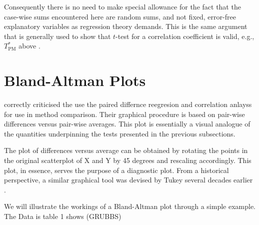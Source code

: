 \documentclass[12pt, a4paper]{report}
\theoremstyle{plain}
\theoremstyle{definition}
\theoremstyle{remark}
\begin{document}
Consequently there is no need to make special allowance for the fact that the case-wise sums encountered here are random sums, and not fixed, error-free explanatory variables as regression theory demands. This is the same argument that is generally used to show that $t$-test for a correlation coefficient is valid, e.g., $T^*_\mathrm{PM}$ above \citep[page 499]{Hogg}.




\section*{Bland-Altman Plots}

\citet{BA83} correctly criticised the use the paired differnce reegresion and correlation anlayss for use in method comparison. Their graphical procedure is based on pair-wise differences versus pair-wise averages. This plot is essentially a visual analogue of the quantities underpinning the tests presented in the previous subsections.



The plot of differences versus average can be obtained by rotating the points in the original scatterplot of X and Y by 45 degrees and rescaling accordingly. This plot, in essence, serves the purpose of a diagnostic plot.
From a historical perspective, a similar graphical tool was devised by Tukey several decades earlier \citet{kozak2014including}.

We will illustrate the workings of a Bland-Altman plot through a simple example. The Data is table 1 shows (GRUBBS)
\end{document}
